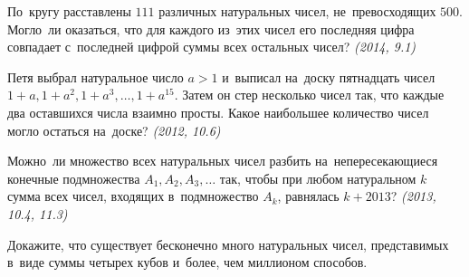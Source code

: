 \begin{problems}


\item
По~кругу расставлены $111$ различных натуральных чисел, не~превосходящих $500$.
Могло~ли оказаться, что для каждого из~этих чисел его последняя цифра совпадает
с~последней цифрой суммы всех остальных чисел?
\emph{(2014, 9.1)}

\item
Петя выбрал натуральное число $a > 1$ и~выписал на~доску пятнадцать чисел
$1 + a, 1 + a^2, 1 + a^3, \ldots, 1 + a^{15}$.
Затем он стер несколько чисел так, что каждые два оставшихся числа взаимно
просты.
Какое наибольшее количество чисел могло остаться на~доске?
\emph{(2012, 10.6)}

\item
Можно~ли множество всех натуральных чисел разбить на~непересекающиеся конечные
подмножества $A_1, A_2, A_3, \ldots$ так, чтобы при любом натуральном $k$ сумма
всех чисел, входящих в~подмножество $A_k$, равнялась $k+2013$?
\emph{(2013, 10.4, 11.3)}

\item
Докажите, что существует бесконечно много натуральных чисел, представимых
в~виде суммы четырех кубов и~более, чем миллионом способов.

\iffalse %

\item
Федя выписывает слева направо бесконечную последовательность ненулевых цифр.
После выписывания каждой цифры он раскладывает на~простые множители
получившееся к~этому моменту число.
Докажите, что однажды этих простых множителей будет больше $100$.

\item
Пусть $p = 4 k + 1$~--- простое число, $A$~--- подмножество множества
$\{ 1, 2, \ldots, p - 1 \}$, причем для любых чисел $a, b \in A$ существует
натуральное число $t$, такое что $(a - b - t^2)$ делится на~$p$.
Докажите, что $\abs{A} < \sqrt{p}$.

\fi %

\end{problems}

\endgroup %

